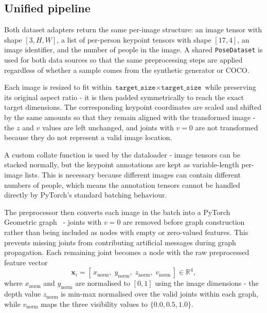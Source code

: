 \subsection{Unified pipeline}
\label{sec_meth_data_pipeline}

Both dataset adapters return the same per-image structure:
an image tensor with shape $[3,H,W]$,
a list of per-person keypoint tensors with shape $[17,4]$,
an image identifier,
and the number of people in the image.
A shared \texttt{PoseDataset} is used for both data sources
so that the same preprocessing steps are applied
regardless of whether a sample comes from the synthetic generator or COCO.

Each image is resized to fit within $\texttt{target\_size} \times \texttt{target\_size}$
while preserving its original aspect ratio -
it is then padded symmetrically to reach the exact target dimensions.
The corresponding keypoint coordinates are scaled and shifted by the same amounts
so that they remain aligned with the transformed image -
the $z$ and $v$ values are left unchanged,
and joints with $v=0$ are not transformed because they do not represent a valid image location.

A custom collate function is used by the dataloader -
image tensors can be stacked normally,
but the keypoint annotations are kept as variable-length per-image lists.
This is necessary because different images can contain different numbers of people,
which means the annotation tensors cannot be handled directly
by PyTorch's standard batching behaviour.

The preprocessor then converts each image in the batch into a PyTorch Geometric graph~\cite{fey2019pyg} -
joints with $v=0$ are removed before graph construction
rather than being included as nodes with empty or zero-valued features.
This prevents missing joints from contributing artificial messages during graph propagation.
Each remaining joint becomes a node with the raw preprocessed feature vector
\begin{equation}
    \mathbf{x}_i
    =
    [\,x_{\text{norm}},\;
      y_{\text{norm}},\;
      z_{\text{norm}},\;
      v_{\text{norm}}\,]
    \in \mathbb{R}^{4},
    \label{eq:node_feature_with_depth}
\end{equation}
where $x_{\text{norm}}$ and $y_{\text{norm}}$ are normalised to $[0,1]$ using the image dimensions -
the depth value $z_{\text{norm}}$ is min-max normalised over the valid joints within each graph,
while $v_{\text{norm}}$ maps the three visibility values to $\{0.0,0.5,1.0\}$.

